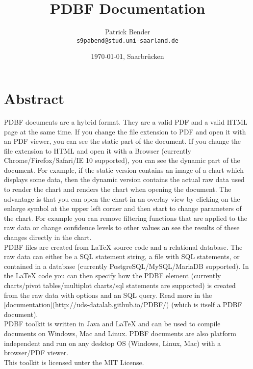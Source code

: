 \documentclass[11pt]{article}
\title{PDBF Documentation}
\author{
 Patrick Bender\\
  \texttt{s9pabend@stud.uni-saarland.de}
}
\date{\today{}, Saarbrücken}
\begin{document}
\maketitle

\section{Abstract}
PDBF documents are a hybrid format. They are a valid PDF and a valid HTML page at the same time. 
If you change the file extension to PDF and open it with an PDF viewer, you can see the static part of the document. If you change the file extension to HTML and open it with a Browser (currently Chrome/Firefox/Safari/IE 10 supported), you can see the dynamic part of the document. For example, if the static version contains an image of a chart which displays some data, then the dynamic version contains the actual raw data used to render the chart and renders the chart when opening the document. The advantage is that you can open the chart in an overlay view by clicking on the enlarge symbol at the upper left corner and then start to change parameters of the chart. For example you can remove filtering functions that are applied to the raw data or change confidence levels to other values an see the results of these changes directly in the chart. \\

\noindent PDBF files are created from LaTeX source code and a relational database. The raw data can either be a SQL statement string, a file with SQL statements, or contained in a database (currently PostgreSQL/MySQL/MariaDB supported). In the LaTeX code you can then specify how the PDBF element (currently charts/pivot tables/multiplot charts/sql statements are supported) is created from the raw data with options and an SQL query. Read more in the [documentation](http://uds-datalab.github.io/PDBF/) (which is itself a PDBF document).\\

\noindent PDBF toolkit is written in Java and LaTeX and can be used to compile documents on Windows, Mac and Linux. PDBF documents are also platform independent and run on any desktop OS (Windows, Linux, Mac) with a browser/PDF viewer.\\

\noindent This toolkit is licensed unter the MIT License.\\
\end{document}
